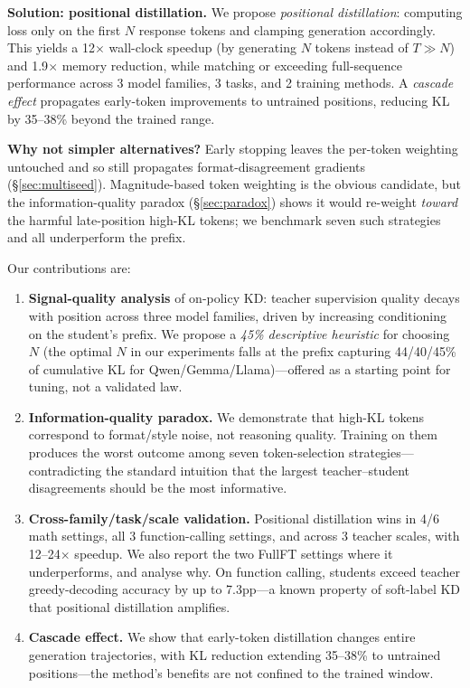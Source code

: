 \documentclass[10pt]{article}
\begin{document}
\textbf{Solution: positional distillation.}
We propose \emph{positional distillation}: computing loss only on the first $N$ response tokens and clamping generation accordingly.
This yields a 12$\times$ wall-clock speedup (by generating $N$ tokens instead of $T \gg N$) and 1.9$\times$ memory reduction, while matching or exceeding full-sequence performance across 3 model families, 3 tasks, and 2 training methods.
A \emph{cascade effect} propagates early-token improvements to untrained positions, reducing KL by 35--38\% beyond the trained range.

\textbf{Why not simpler alternatives?} Early stopping leaves the per-token weighting untouched and so still propagates format-disagreement gradients (\S\ref{sec:multiseed}). Magnitude-based token weighting \citep{wang2025beyond8020,huang2025selectkd} is the obvious candidate, but the information-quality paradox (\S\ref{sec:paradox}) shows it would re-weight \emph{toward} the harmful late-position high-KL tokens; we benchmark seven such strategies and all underperform the prefix.

Our contributions are:
\begin{enumerate}
  \item \textbf{Signal-quality analysis} of on-policy KD: teacher supervision quality decays with position across three model families, driven by increasing conditioning on the student's prefix. We propose a \emph{45\% descriptive heuristic} for choosing $N$ (the optimal $N$ in our experiments falls at the prefix capturing 44/40/45\% of cumulative KL for Qwen/Gemma/Llama)---offered as a starting point for tuning, not a validated law.
  \item \textbf{Information-quality paradox.} We demonstrate that high-KL tokens correspond to format/style noise, not reasoning quality. Training on them produces the worst outcome among seven token-selection strategies---contradicting the standard intuition that the largest teacher--student disagreements should be the most informative.
  \item \textbf{Cross-family/task/scale validation.} Positional distillation wins in 4/6 math settings, all 3 function-calling settings, and across 3 teacher scales, with 12--24$\times$ speedup. We also report the two FullFT settings where it underperforms, and analyse why. On function calling, students exceed teacher greedy-decoding accuracy by up to 7.3pp---a known property of soft-label KD that positional distillation amplifies.
  \item \textbf{Cascade effect.} We show that early-token distillation changes entire generation trajectories, with KL reduction extending 35--38\% to untrained positions---the method's benefits are not confined to the trained window.
\end{enumerate}
\end{document}
